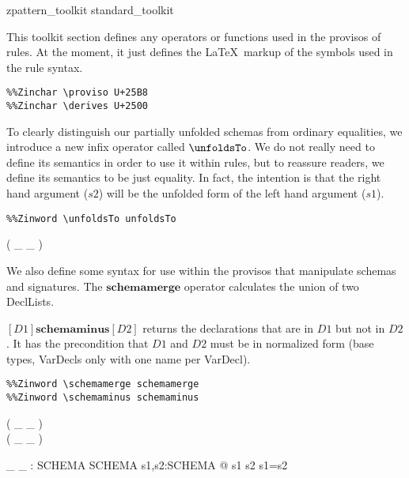 \newcommand{\schemaminus}{\mathbin{\textbf{schemaminus}}}
\newcommand{\schemamerge}{\mathbin{\textbf{schemamerge}}}

\begin{zsection}
  \SECTION zpattern\_toolkit \parents standard\_toolkit
\end{zsection}

This toolkit section defines any operators or functions used in the
provisos of rules.  At the moment, it just defines the \LaTeX\ markup
of the symbols used in the rule syntax.

\begin{verbatim}
%%Zinchar \proviso U+25B8
%%Zinchar \derives U+2500
\end{verbatim}

To clearly distinguish our partially unfolded schemas from ordinary
equalities, we introduce a new infix operator called $\unfoldsTo$.  We
do not really need to define its semantics in order to use it within
rules, but to reassure readers, we define its semantics to be just
equality.  In fact, the intention is that the right hand argument
($s2$) will be the unfolded form of the left hand argument ($s1$).

\begin{verbatim}
%%Zinword \unfoldsTo unfoldsTo
\end{verbatim}

\begin{zed}
  \relation ( \_ \unfoldsTo \_ )
\end{zed}

We also define some syntax for use within the provisos that manipulate
schemas and signatures.  The $\schemamerge$ operator calculates
the union of two DeclLists. 

$[D1] \schemaminus [D2]$ returns the declarations that are in
$D1$ but not in $D2$.  It has the precondition that $D1$ and $D2$
must be in normalized form (base types, VarDecls only with one 
name per VarDecl).

\begin{verbatim}
%%Zinword \schemamerge schemamerge
%%Zinword \schemaminus schemaminus
\end{verbatim}

\begin{zed}
   \leftassoc ( \_ \schemamerge \_ ) \\
   \leftassoc ( \_ \schemaminus \_ )
\end{zed}

\begin{gendef}[SCHEMA]
  \_ \unfoldsTo \_ : SCHEMA \rel SCHEMA
\where
  \forall s1,s2:SCHEMA @ s1 \unfoldsTo s2 \iff s1=s2
\end{gendef}


